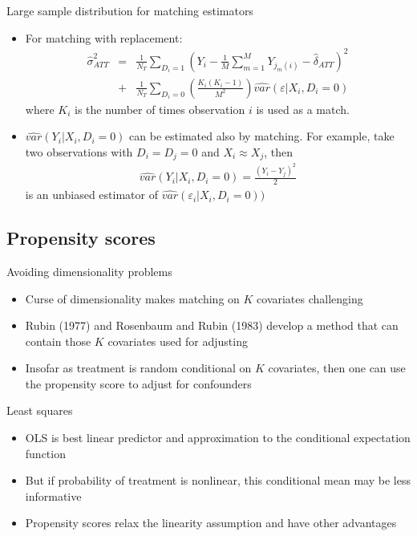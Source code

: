 \documentclass{beamer}
\begin{document}
\begin{frame}{Large sample distribution for matching estimators}
	
	\begin{itemize}
	\item For matching with replacement:
		\begin{eqnarray*}
		\widehat{\sigma}^2_{ATT} &=& \frac{1}{N_T} \sum_{D_i=1} \left( Y_i - \frac{1}{M} \sum_{m=1}^M Y_{j_m(i)} - \widehat{\delta}_{ATT} \right)^2 \\
		&+& \frac{1}{N_T} \sum_{D_i=0} \left( \frac{K_i(K_i-1)}{M^2} \right) \widehat{var}(\varepsilon | X_i,D_i=0)
		\end{eqnarray*}where $K_i$ is the number of times observation $i$ is used as a match.
	\item $\widehat{var}(Y_i | X_i,D_i=0)$ can be estimated also by matching.  For example, take two observations with $D_i=D_j=0$ and $X_i \approx X_j$, then
		\begin{eqnarray*}
		\widehat{var}(Y_i | X_i,D_i=0) = \frac{(Y_i-Y_j)^2}{2}
		\end{eqnarray*}is an unbiased estimator of $\widehat{var}(\varepsilon_i | X_i,D_i=0))$
	\end{itemize}
\end{frame}
	

		  
\subsection{Propensity scores}

\begin{frame}{Avoiding dimensionality problems}
	
	\begin{itemize}
	\item Curse of dimensionality makes matching on $K$ covariates challenging
	\item Rubin (1977) and Rosenbaum and Rubin (1983) develop a method that can contain those $K$ covariates used for adjusting
	\item Insofar as treatment is random conditional on $K$ covariates, then one can use the propensity score to adjust for confounders 
	\end{itemize}
	
\end{frame}



\begin{frame}{Least squares}
	
	\begin{itemize}
	\item OLS is best linear predictor and approximation to the conditional expectation function 
	\item But if probability of treatment is nonlinear, this conditional mean may be less informative
	\item Propensity scores relax the linearity assumption and have other advantages
	\end{itemize}
\end{frame}
\end{document}
